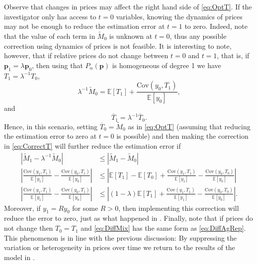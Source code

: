 \documentclass[english, a4paper,12pt]{article}
\begin{document}
Observe that changes in prices may affect the right hand side of \eqref{eq:OptT}. If the investigator only has access to $t =0$ variables, knowing the dynamics of prices may not be enough to reduce the estimation error at $t =1$ to zero. Indeed, note that the value of each term in $\tilde{M}_{0}$ is unknown at $t=0$, thus any possible correction using dynamics of prices is not feasible. It is interesting to note, however, that if relative prices do not change between $t=0$ and $t=1$, that is, if $\mathbf{p}_{1} = \lambda \mathbf{p}_{0}$, then using that $P_{\alpha}(\mathbf{p})$ is homogeneous of degree 1 we have $T_{1} = \lambda^{-1}T_{0}$,
	$$\lambda^{-1}\tilde{M}_{0} = \mathbb{E}[T_{1}] + \frac{\mathrm{Cov}\left(y_{0}, T_{1} \right)}{\mathbb{E}[y_{0}]},$$
and
	\begin{equation} \label{eq:CorrectT}
		\overline{T}_{1} = \lambda^{-1}\overline{T}_{0}.
	\end{equation}
Hence, in this scenario, setting $\overline{T}_{0} = \tilde{M}_{0}$ as in \eqref{eq:OptT} (assuming that reducing the estimation error to zero at $t=0$ is possible) and then making the correction in \eqref{eq:CorrectT} will further reduce the estimation error if
	\begin{align*}
		\left|\tilde{M}_{1} - \lambda^{-1}\tilde{M}_{0} \right|
			&\leq \left|\tilde{M}_{1} - \tilde{M}_{0} \right|	\\
		\left| \frac{\mathrm{Cov}\left(y_{1}, T_{1} \right)}{\mathbb{E}[y_{1}]} - \frac{\mathrm{Cov}\left(y_{0}, T_{1} \right)}{\mathbb{E}[y_{0}]} \right|
			&\leq \left| \mathbb{E}\left[T_{1} \right] - \mathbb{E}\left[T_{0} \right] + \frac{\mathrm{Cov}\left(y_{1}, T_{1} \right)}{\mathbb{E}[y_{1}]} - \frac{\mathrm{Cov}\left(y_{0}, T_{0} \right)}{\mathbb{E}[y_{0}]} \right|	\\
		\left| \frac{\mathrm{Cov}\left(y_{1}, T_{1} \right)}{\mathbb{E}[y_{1}]} - \frac{\mathrm{Cov}\left(y_{0}, T_{1} \right)}{\mathbb{E}[y_{0}]} \right|
			&\leq \left| (1-\lambda)\mathbb{E}\left[T_{1} \right] + \frac{\mathrm{Cov}\left(y_{1}, T_{1} \right)}{\mathbb{E}[y_{1}]} - \frac{\mathrm{Cov}\left(y_{0}, T_{0} \right)}{\mathbb{E}[y_{0}]} \right|.
	\end{align*}
Moreover, if $y_{1} = Ry_{0}$ for some $R>0$, then implementing this correction will reduce the error to zero, just as what happened in . Finally, note that if prices do not change then $T_{0} = T_{1}$ and \eqref{eq:DiffMix} has the same form as \eqref{eq:DiffAgRep}. This phenomenon is in line with the previous discussion: By suppressing the variation or heterogeneity in prices over time we return to the results of the model in .
\end{document}
